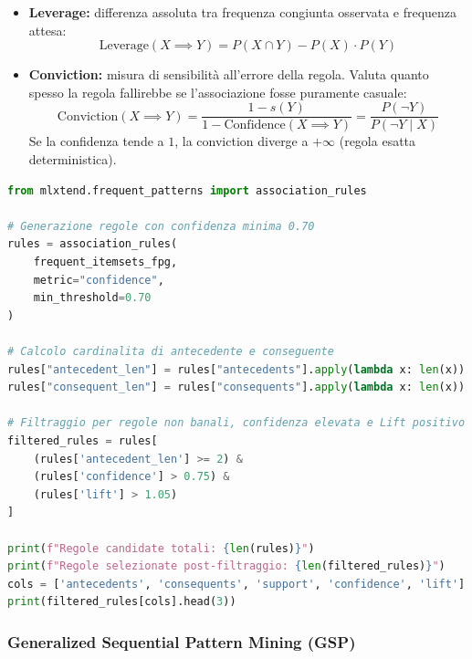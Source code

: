 \begin{definition}
\begin{itemize}
\begin{itemize}
    \end{itemize}
    \item \textbf{Leverage:} differenza assoluta tra frequenza congiunta osservata e frequenza attesa:
    \begin{equation}
        \text{Leverage}(X \implies Y) = P(X \cap Y) - P(X) \cdot P(Y)
    \end{equation}
    \item \textbf{Conviction:} misura di sensibilità all'errore della regola. Valuta quanto spesso la regola fallirebbe se l'associazione fosse puramente casuale:
    \begin{equation}
        \text{Conviction}(X \implies Y) = \frac{1 - s(Y)}{1 - \text{Confidence}(X \implies Y)} = \frac{P(\neg Y)}{P(\neg Y \mid X)}
    \end{equation}
    Se la confidenza tende a $1$, la conviction diverge a $+\infty$ (regola esatta deterministica).
\end{itemize}
\end{definition}

\begin{lstlisting}[language=Python, caption={Estrazione e filtraggio avanzato delle regole d'associazione.}]
from mlxtend.frequent_patterns import association_rules

# Generazione regole con confidenza minima 0.70
rules = association_rules(
    frequent_itemsets_fpg,
    metric="confidence",
    min_threshold=0.70
)

# Calcolo cardinalita di antecedente e conseguente
rules["antecedent_len"] = rules["antecedents"].apply(lambda x: len(x))
rules["consequent_len"] = rules["consequents"].apply(lambda x: len(x))

# Filtraggio per regole non banali, confidenza elevata e Lift positivo
filtered_rules = rules[
    (rules['antecedent_len'] >= 2) & 
    (rules['confidence'] > 0.75) & 
    (rules['lift'] > 1.05)
]

print(f"Regole candidate totali: {len(rules)}")
print(f"Regole selezionate post-filtraggio: {len(filtered_rules)}")
cols = ['antecedents', 'consequents', 'support', 'confidence', 'lift']
print(filtered_rules[cols].head(3))
\end{lstlisting}

\FloatBarrier
\subsubsection{Generalized Sequential Pattern Mining (GSP)}
\label{subsec:lab-gsp-sequential}

